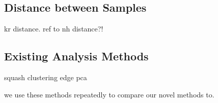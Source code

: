 \subsection{Distance between Samples}
\label{ch:Foundations:sec:PhylogeneticPlacementProcessing:sub:Distances}

kr distance. ref to nh distance?!
\cite{Evans2012}


\subsection{Existing Analysis Methods}
\label{ch:Foundations:sec:PhylogeneticPlacementProcessing:sub:ExistingMethods}

squash clustering
edge pca
\cite{Matsen2011a,Evans2012}

we use these methods repeatedly to compare our novel methods to.
